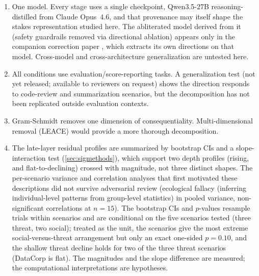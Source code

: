 \documentclass[11pt,letterpaper]{article}
\begin{document}
\begin{enumerate}[label=\arabic*., ref=\arabic*]
  \item One model. Every stage uses a single checkpoint, Qwen3.5-27B reasoning-distilled from
    Claude Opus~4.6, and that provenance may itself shape the stakes representation studied here. The
    abliterated model derived from it (safety guardrails removed via directional ablation) appears only in the
    companion correction paper \cite{cc2026targeted}, which extracts its own directions on that model.
    Cross-model and cross-architecture generalization are untested here.

  \item All conditions use evaluation/score-reporting tasks. A generalization test (not yet released; available to reviewers on request)
    shows the direction responds to code-review and summarization scenarios, but the decomposition
    has not been replicated outside evaluation contexts.

  \item Gram-Schmidt removes one dimension of consequentiality. Multi-dimensional removal (LEACE)
    would provide a more thorough decomposition.

  \item The late-layer residual profiles are summarized by bootstrap CIs and a slope-interaction test
    (\cref{sec:sigmethods}), which support two depth profiles (rising, and flat-to-declining) crossed
    with magnitude, not three distinct shapes. The per-scenario variance and correlation analyses that
    first motivated these descriptions did not survive adversarial review (ecological fallacy
    (inferring individual-level patterns from group-level statistics) in pooled variance,
    non-significant correlations at $n=15$). The bootstrap CIs and $p$-values resample trials within scenarios and are conditional on
    the five scenarios tested (three threat, two social); treated as the unit, the scenarios give the
    most extreme social-versus-threat arrangement but only an exact one-sided $p=0.10$, and the shallow
    threat decline holds for two of the three threat scenarios (DataCorp is flat). The magnitudes and the
    slope difference are measured; the computational interpretations are hypotheses.


\end{enumerate}
\end{document}
